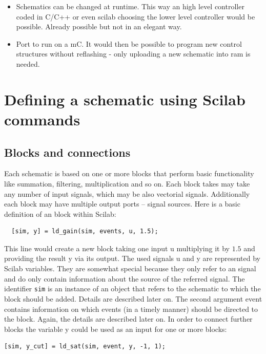 \documentclass[%
	pdftex,%
	a4paper,%
	oneside,%
	11pt,%
	halfparskip,%
	headsepline,%
	bibtotocnumbered,%
	idxtotoc%
]{scrartcl}
\begin{document}
\begin{itemize}
  \item Schematics can be changed at runtime. This way an high level controller coded in C/C++ or even scilab choosing the lower level controller would be possible. Already possible but not in an elegant way.
  \item Port to run on a mC. It would then be possible to program new control structures without reflashing - only uploading a new schematic into ram is needed.
\end{itemize}


\section{Defining a schematic using Scilab commands}

\subsection{Blocks and connections}

Each schematic is based on one or more blocks that perform basic functionality like summation, filtering, multiplication and so on. Each block takes may take any number of input signals, which may be also vectorial signals. Additionally each block may have multiple output ports -- signal sources. Here is a basic definition of an block within Scilab:

\begin{verbatim}
  [sim, y] = ld_gain(sim, events, u, 1.5);
\end{verbatim}

This line would create a new block taking one input u multiplying it by $1.5$ and providing the result y via its output. The used signals u and y are represented by Scilab variables. They are somewhat special because they only refer to an signal and do only contain information about the source of the referred signal.
The identifier \texttt{sim} is an instance of an object that refers to the schematic to which the block should be added. Details are described later on. The second argument event contains information on which events (in a timely manner) should be directed to the block. Again, the details are described later on.
In order to connect further blocks the variable y could be used as an input for one or more blocks:

\begin{verbatim}
[sim, y_cut] = ld_sat(sim, event, y, -1, 1);
\end{verbatim}
\end{document}
